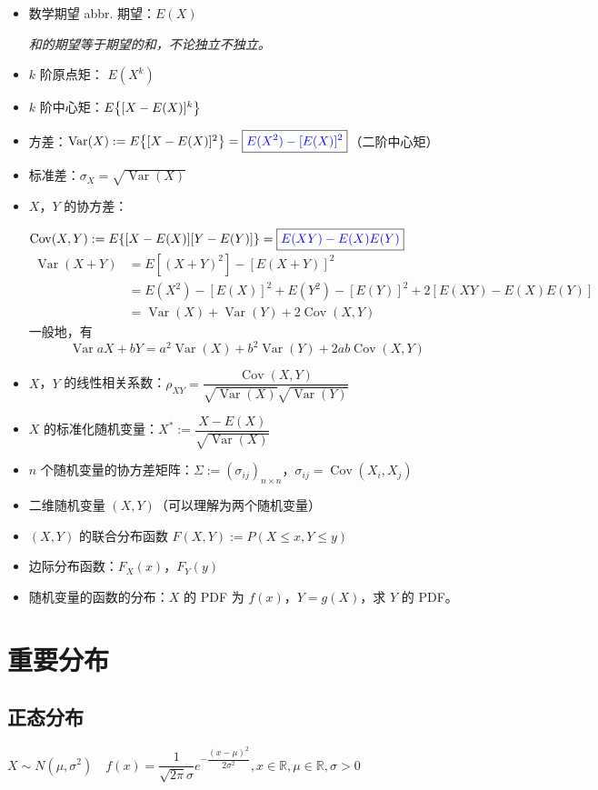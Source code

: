 \documentclass[12pt,uft8]{ctexrep}
\DeclareMathOperator{\Var}{Var}
\DeclareMathOperator{\Cov}{Cov}
\begin{document}
\begin{itemize}
\item 数学期望 abbr. 期望：$E(X)$

\emph{和的期望等于期望的和，不论独立不独立。}

\item $k$ 阶原点矩： $E(X^k)$
\item $k$ 阶中心矩：$E\qty{[X-E(X)]^k}$
\item 方差：$\Var(X) := E\qty{[X-E(X)]^2} =\boxed{\color{blue}{ E(X^2) - [E(X)]^2 }}$（二阶中心矩）
\item 标准差：$\sigma_X = \sqrt{\Var(X)}$
\item $X$，$Y$ 的协方差：

$\Cov(X,Y) := E\qty{[X-E(X)] [Y-E(Y)]} = \boxed{\color{blue}E(XY) - E(X)E(Y)}$
\begin{align*}
\Var(X+Y)& = E[(X+Y)^2] - [E(X+Y)]^2 \\
&= E(X^2) - [E(X)]^2 + E(Y^2) - [E(Y)]^2 + 2[E(XY)- E(X)E(Y)] \\
&= \Var(X) + \Var(Y) + 2\Cov(X,Y) 
\end{align*}
一般地，有
\[\Var{aX+bY} = a^2\Var(X) + b^2\Var(Y) + 2ab\Cov(X,Y)\]
\item $X$，$Y$ 的线性相关系数：$\rho_{XY} = \dfrac{\Cov(X,Y)}{\sqrt{\Var(X)}\sqrt{\Var(Y)}}$
\item $X$ 的标准化随机变量：$X^* := \dfrac{X-E(X)} {\sqrt{\Var(X)}}$
\item $n$ 个随机变量的协方差矩阵：$\Sigma := (\sigma_{ij})_{n\times n}$，$\sigma_{ij} = \Cov(X_i,X_j)$

\item 二维随机变量 $(X,Y)$（可以理解为两个随机变量）
\item $(X,Y)$ 的联合分布函数 $F(X,Y) := P(X\le x, Y\le y)$ 
\item 边际分布函数：$F_X(x)$，$F_Y(y)$
\item 随机变量的函数的分布：$X$ 的 PDF 为 $f(x)$，$Y=g(X)$，求 $Y$ 的 PDF。

\end{itemize}

\section{重要分布}
\subsection{正态分布}
$X\sim N(\mu,\sigma^2)\quad f(x) = \dfrac{1}{\sqrt{2\pi}\sigma} e^{-\dfrac{(x-\mu)^2}{2\sigma^2}}, x\in\mathbb R, \mu\in\mathbb R, \sigma > 0 $
\end{document}
